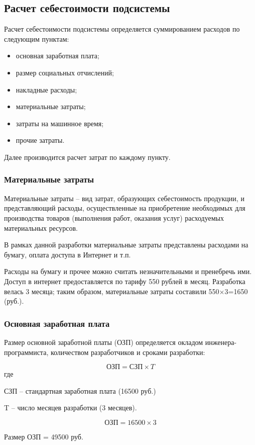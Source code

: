 \documentclass[a4paper]{extarticle}
\begin{document}
\subsection{Расчет себестоимости подсистемы}
Расчет себестоимости подсистемы определяется суммированием расходов по следующим пунктам:
\begin{itemize}
\item основная заработная плата;
\item размер социальных отчислений;
\item накладные расходы;
\item материальные затраты;
\item затраты на машинное время;
\item прочие затраты.
\end{itemize}
Далее производится расчет затрат по каждому пункту.\par

\subsubsection{Материальные затраты}
Материальные затраты – вид затрат, образующих себестоимость продукции, и представляющий расходы, осуществленные на приобретение необходимых для производства товаров (выполнения работ, оказания услуг) расходуемых материальных ресурсов.\par
В рамках данной разработки материальные затраты представлены расходами на бумагу, оплата доступа в Интернет и т.п.\par
Расходы на бумагу и прочее можно считать незначительными и пренебречь ими. Доступ в интернет предоставляется по тарифу 550 рублей в месяц. Разработка велась 3 месяца; таким образом, материальные затраты составили 550$\times$3=1650 (руб.).

\subsubsection{Основная заработная плата}
Размер основной заработной платы (ОЗП) определяется окладом инженера-программиста, количеством разработчиков и сроками разработки:\par
\begin{equation}
\label{form1}
	\text{ОЗП} = \text{СЗП}\times T
\end{equation}
где\par
СЗП – стандартная заработная плата (16500 руб.)\par
T – число месяцев разработки (3 месяцев).\par
\begin{equation}
\label{form2}
	\text{ОЗП} = 16500\times 3
\end{equation}\par
Размер  ОЗП = 49500 руб.
\end{document}
